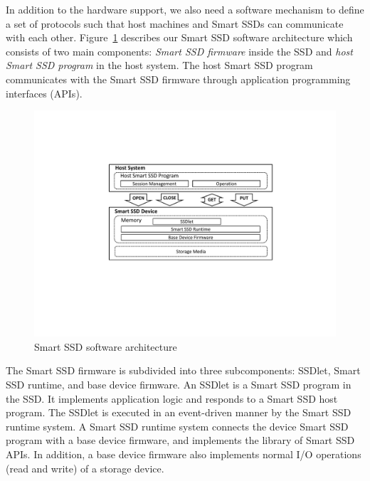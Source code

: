 In addition to the hardware support, we also need a software mechanism to define a set of protocols such that host machines and Smart SSDs can communicate with each other. Figure~\ref{fig:SmartSSD_arch} describes our Smart SSD software architecture which consists of two main components: \emph{Smart SSD firmware} inside the SSD and \emph{host Smart SSD program} in the host system.
The host Smart SSD program communicates with the Smart SSD firmware through application programming interfaces (APIs).




\begin{figure}[tbp]
	\centering
		\includegraphics[width=0.95\columnwidth]{figures/SmartSSD_Architecture.pdf}
	\caption{Smart SSD software architecture}
	\label{fig:SmartSSD_arch}
\end{figure}


The Smart SSD firmware is subdivided into three subcomponents: SSDlet, Smart SSD runtime, and base device firmware.
An SSDlet is a Smart SSD program in the SSD. It implements application logic and responds to a Smart SSD host program. The SSDlet is executed in an event-driven manner by the Smart SSD runtime system. A Smart SSD runtime system connects the device Smart SSD program with a base device firmware, and implements the library of Smart SSD APIs. In addition, a base device firmware also implements normal I/O operations (read and write) of a storage device.

